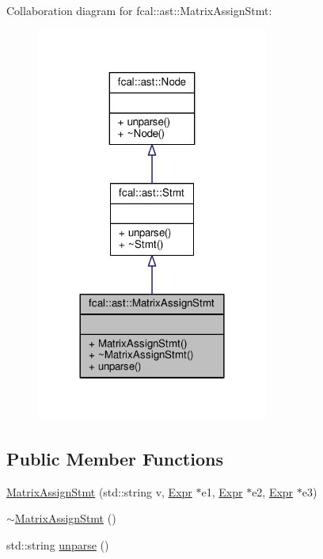 Collaboration diagram for fcal\+:\+:ast\+:\+:Matrix\+Assign\+Stmt\+:
\nopagebreak
\begin{figure}[H]
\begin{center}
\leavevmode
\includegraphics[width=216pt]{classfcal_1_1ast_1_1MatrixAssignStmt__coll__graph}
\end{center}
\end{figure}
\subsection*{Public Member Functions}
\begin{DoxyCompactItemize}
\item 
\hyperlink{classfcal_1_1ast_1_1MatrixAssignStmt_ac40c1ee4262607fded1962885a1b49cf}{Matrix\+Assign\+Stmt} (std\+::string v, \hyperlink{classfcal_1_1ast_1_1Expr}{Expr} $\ast$e1, \hyperlink{classfcal_1_1ast_1_1Expr}{Expr} $\ast$e2, \hyperlink{classfcal_1_1ast_1_1Expr}{Expr} $\ast$e3)
\item 
\hyperlink{classfcal_1_1ast_1_1MatrixAssignStmt_a3ca9849401f3c1c8c3b6825447a1825c}{$\sim$\+Matrix\+Assign\+Stmt} ()
\item 
std\+::string \hyperlink{classfcal_1_1ast_1_1MatrixAssignStmt_a09148bcbd78fcd071b92e5c79d4b0002}{unparse} ()
\end{DoxyCompactItemize}


